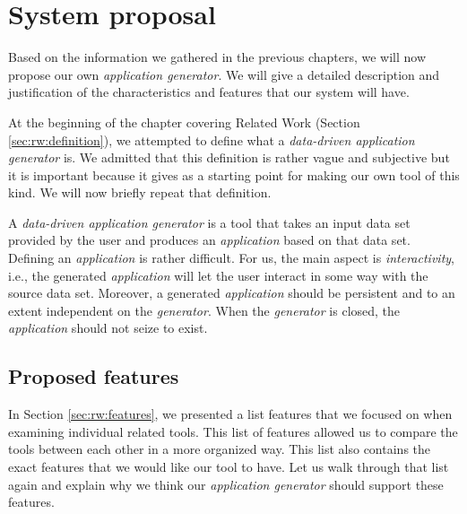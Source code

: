 \chapter{System proposal}
\label{chap:system-proposal}

Based on the information we gathered in the previous chapters, we will now propose our own \emph{application generator}. We will give a detailed description and justification of the characteristics and features that our system will have. 

At the beginning of the chapter covering Related Work (Section \ref{sec:rw:definition}), we attempted to define what a \emph{data-driven application generator} is. We admitted that this definition is rather vague and subjective but it is important because it gives as a starting point for making our own tool of this kind. We will now briefly repeat that definition.

A \emph{data-driven application generator} is a tool that takes an input data set provided by the user and produces an \emph{application} based on that data set. Defining an \emph{application} is rather difficult. For us, the main aspect is \emph{interactivity}, i.e., the generated \emph{application} will let the user interact in some way with the source data set. Moreover, a generated \emph{application} should be persistent and to an extent independent on the \emph{generator}. When the \emph{generator} is closed, the \emph{application} should not seize to exist.

\section{Proposed features}
\label{sec:proposal:features}

In Section \ref{sec:rw:features}, we presented a list features that we focused on when examining individual related tools. This list of features allowed us to compare the tools between each other in a more organized way. This list also contains the exact features that we would like our tool to have. Let us walk through that list again and explain why we think our \emph{application generator} should support these features.

